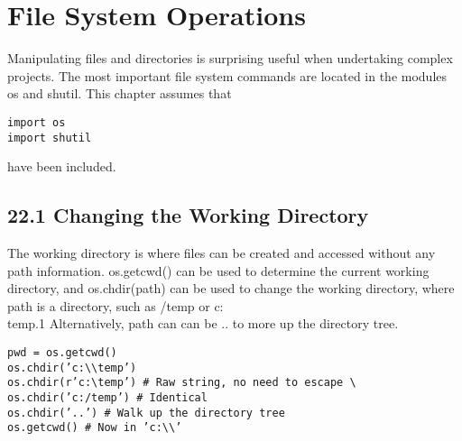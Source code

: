 \documentclass[KSmain.tex]{subfiles}
\begin{document}
 
\newpage
\section{File System Operations}
Manipulating files and directories is surprising useful when undertaking complex projects. The most important
file system commands are located in the modules os and shutil. This chapter assumes that
\begin{framed}
\begin{verbatim}
import os
import shutil
\end{verbatim}
\end{framed}
have been included.
\subsection{22.1 Changing the Working Directory}
The working directory is where files can be created and accessed without any path information. os.getcwd()
can be used to determine the current working directory, and os.chdir(path) can be used to change the
working directory, where path is a directory, such as /temp or c:\\temp.1 Alternatively, path can can be .. to
more up the directory tree.
\begin{framed}
\begin{verbatim}
pwd = os.getcwd()
os.chdir(’c:\\temp’)
os.chdir(r’c:\temp’) # Raw string, no need to escape \
os.chdir(’c:/temp’) # Identical
os.chdir(’..’) # Walk up the directory tree
os.getcwd() # Now in ’c:\\’
\end{verbatim}
\end{framed}
\end{document}
